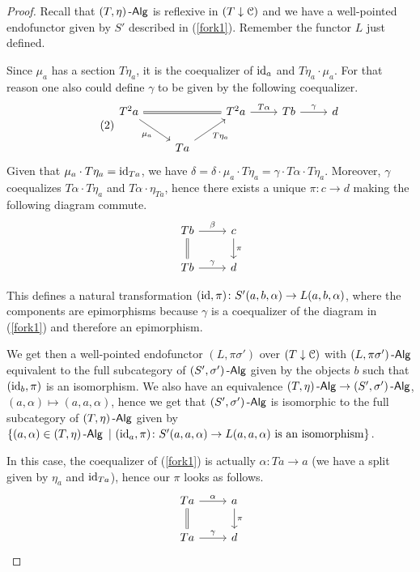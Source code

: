 \documentclass[a4paper,11pt,oneside,openany]{scrbook}
\begin{document}
\begin{proof}
	Recall that $(T,\eta)\operatorname{-\mathsf{Alg}}$ is reflexive in $(T\downarrow\operatorname{\mathcal{C}})$ and we have a well-pointed endofunctor given by $S'$ described in (\ref{fork1}). Remember the functor $L$ just defined.

	Since $\mu_a$ has a section $T\eta_a$, it is the coequalizer of $\operatorname{id}_a$ and $T\eta_a\cdot\mu_a$. For that reason one also could define $\gamma$ to be given by the following coequalizer.
	\[
		\tag{2}\label{fork2}
		\begin{tikzcd}
			T^2a\ar[rr, equal]\ar[dr, swap, "\mu_a"]
			&& T^2a\ar[r, "T\alpha"]
			& Tb\ar[r, "\gamma"]
			& d \\
			& Ta\ar[ur, swap, "T\eta_a"]
		\end{tikzcd}
	\]
	Given that $\mu_a\cdot T\eta_a=\operatorname{id}_{Ta}$, we have $\delta=\delta\cdot\mu_a\cdot T\eta_a=\gamma\cdot T\alpha\cdot T\eta_a$. Moreover, $\gamma$ coequalizes $T\alpha\cdot T\eta_a$ and $T\alpha\cdot\eta_{Ta}$, hence there exists a unique $\pi\colon c\rightarrow d$ making the following diagram commute.
	\[
		\begin{tikzcd}
			Tb\ar[d, equal]\ar[r, "\beta"]
			& c\ar[d, "\pi"] \\
			Tb\ar[r, "\gamma"]
			& d
		\end{tikzcd}
	\]

	This defines a natural transformation $(\operatorname{id},\pi)\colon S'(a,b,\alpha)\rightarrow L(a,b,\alpha)$, where the components are epimorphisms because $\gamma$ is a coequalizer of the diagram in (\ref{fork1}) and therefore an epimorphism.

	We get then a well-pointed endofunctor $(L,\pi\sigma')$ over $(T\downarrow\operatorname{\mathcal{C}})$ with $(L,\pi\sigma')\operatorname{-\mathsf{Alg}}$ equivalent to the full subcategory of $(S',\sigma')\operatorname{-\mathsf{Alg}}$ given by the objects $b$ such that $(\operatorname{id}_b,\pi)$ is an isomorphism. We also have an equivalence $(T,\eta)\operatorname{-\mathsf{Alg}}\rightarrow (S',\sigma')\operatorname{-\mathsf{Alg}}$, $(a,\alpha)\mapsto (a,a,\alpha)$, hence we get that $(S',\sigma')\operatorname{-\mathsf{Alg}}$ is isomorphic to the full subcategory of $(T,\eta)\operatorname{-\mathsf{Alg}}$ given by $\{(a,\alpha)\in (T,\eta)\operatorname{-\mathsf{Alg}}\ |\ (\operatorname{id}_a,\pi)\colon S'(a,a,\alpha)\rightarrow L(a,a,\alpha)\text{ is an isomorphism}\}$.

	In this case, the coequalizer of (\ref{fork1}) is actually $\alpha\colon Ta\rightarrow a$ (we have a split given by $\eta_{a}$ and $\operatorname{id}_{Ta}$), hence our $\pi$ looks as follows.
	\[
		\begin{tikzcd}
			Ta\ar[d, equal]\ar[r, "\alpha"]
			& a\ar[d, "\pi"] \\
			Ta\ar[r, "\gamma"]
			& d
		\end{tikzcd}
	\]


\end{proof}
\end{document}

